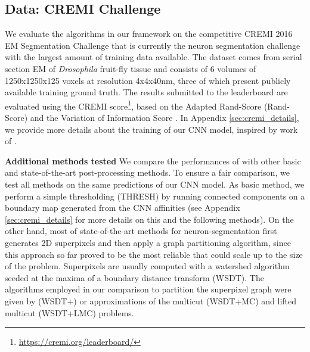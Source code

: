 

\subsection{Data: CREMI Challenge} \label{sec:cremi_challenge}
We evaluate the algorithms in our framework on the competitive CREMI 2016 EM Segmentation Challenge \cite{cremiChallenge} that is currently the neuron segmentation challenge with the largest amount of training data available. The dataset comes from serial section EM of \emph{Drosophila} fruit-fly tissue and consists of 6 volumes of 1250x1250x125 voxels at resolution 4x4x40nm, three of which present publicly available training ground truth. The results submitted to the leaderboard are evaluated using the CREMI score\footnote{\url{https://cremi.org/leaderboard/}}, based on the Adapted Rand-Score (Rand-Score) and the Variation of Information Score \cite{arganda2015crowdsourcing}. In Appendix \ref{sec:cremi_details}, we provide more details about the training of our CNN model, inspired by work of \cite{lee2017superhuman,funke2018large}.


\textbf{Additional methods tested } We compare the performances of \algname{} with other basic and state-of-the-art post-processing methods. To ensure a fair comparison, we test all methods on the same predictions of our CNN model. As basic method, we perform a simple thresholding (THRESH) by running connected components on a boundary map generated from the CNN affinities (see Appendix \ref{sec:cremi_details} for more details on this and the following methods). On the other hand, most of state-of-the-art methods for neuron-segmentation first generates 2D superpixels and then apply a graph partitioning algorithm, since this approach so far proved to be the most reliable that could scale up to the size of the problem. Superpixels are usually computed with a watershed algorithm seeded at the maxima of a boundary distance transform (WSDT). The algorithms employed in our comparison to partition the superpixel graph were given by \algname{} (WSDT+\algname{}) or approximations of the multicut (WSDT+MC) and lifted multicut (WSDT+LMC) problems.


